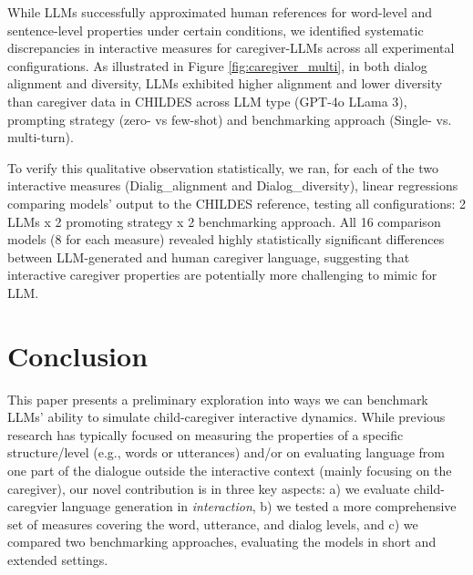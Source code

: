 While LLMs successfully approximated human references for word-level and sentence-level properties under certain conditions, we identified systematic discrepancies in interactive measures for caregiver-LLMs across all experimental configurations. As illustrated in Figure \ref{fig:caregiver_multi}, in both dialog alignment and diversity, LLMs exhibited higher alignment and lower diversity than caregiver data in CHILDES across LLM type (GPT-4o  LLama 3), prompting strategy (zero- vs few-shot) and benchmarking approach (Single- vs. multi-turn). 


To verify this qualitative observation statistically, we ran, for each of the two interactive measures (Dialig\_alignment and Dialog\_diversity), linear regressions comparing models' output to the CHILDES reference, testing all configurations: 2 LLMs x 2 promoting strategy x 2 benchmarking approach. All 16 comparison models (8 for each measure) revealed highly statistically significant differences between LLM-generated and human caregiver language, suggesting that interactive caregiver properties are potentially more challenging to mimic for LLM. 


\section{Conclusion}

This paper presents a preliminary exploration into ways we can benchmark LLMs' ability to simulate child-caregiver interactive dynamics. While previous research has typically focused on measuring the properties of a specific structure/level (e.g., words or utterances) and/or on evaluating language from one part of the dialogue outside the interactive context (mainly focusing on the caregiver), our novel contribution is in three key aspects: a) we evaluate child-caregvier language generation in \textit{interaction},  b) we tested a more comprehensive set of measures covering the word, utterance, and dialog levels, and c) we compared two benchmarking approaches, evaluating the models in short and extended settings. 



